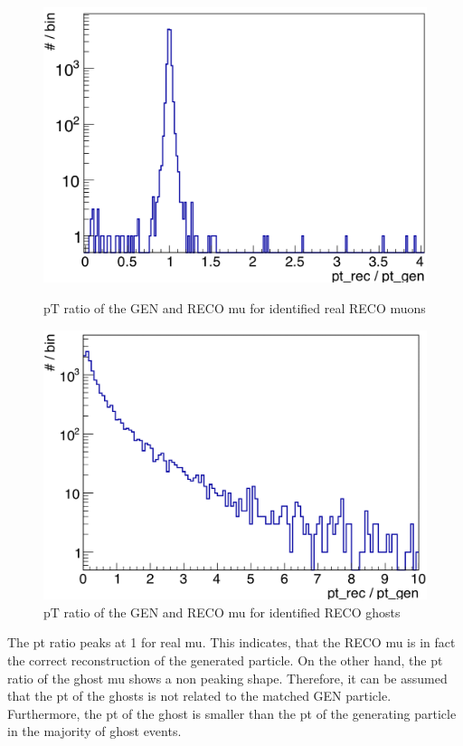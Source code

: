 \begin{figure}[b]
\centering
\begin{minipage}[t]{0.475\textwidth}
\includegraphics[width=\textwidth]{Figures/scheuch/ptRatioRealMu.png}
\caption{$\mathrm{p{T}}$ ratio of the GEN and RECO mu for identified real RECO muons}
\label{PtRatioReal}
\end{minipage}
\hspace{0.5cm}
\begin{minipage}[t]{0.475\textwidth}
\includegraphics[width=\textwidth]{Figures/scheuch/ptRatioGhosts.png}
\caption{$\mathrm{p{T}}$ ratio of the GEN and RECO mu for identified RECO ghosts}
\label{PtRatioGhost}
\end{minipage}
\end{figure}
The pt ratio peaks at 1 for real mu. This indicates, that the RECO mu is in fact the correct reconstruction of the generated particle. On the other hand, the pt ratio of the ghost mu shows a non peaking shape. Therefore, it can be assumed that the pt of the ghosts is not related to the matched GEN particle. Furthermore, the pt of the ghost is smaller than the pt of the generating particle in the majority of ghost events.\\
